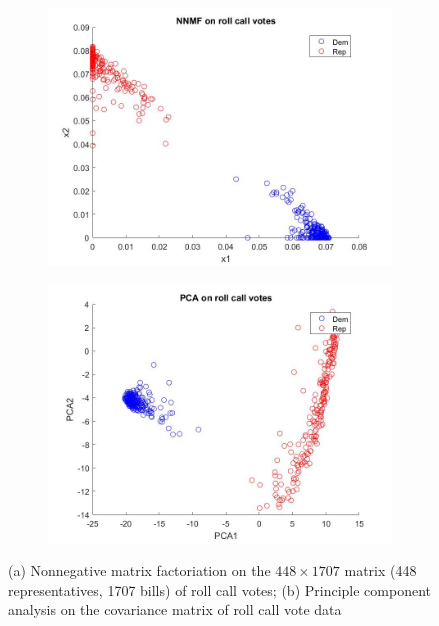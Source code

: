 \documentclass{article}
\begin{document}
\begin{figure}[h]
  \centering
    \begin{subfigure}[b]{0.4\textwidth}
        \includegraphics[width=\textwidth]{NNMF_votes.jpg}
        \caption{}
        \label{fig:NNMF}
    \end{subfigure}
          \begin{subfigure}[b]{0.4\textwidth}
        \includegraphics[width=\textwidth]{PCA_votes}
        \caption{}
        \label{fig:PCA}
    \end{subfigure}
  \caption{(a) Nonnegative matrix factoriation on the $448\times 1707$ matrix (448 representatives, 1707 bills) of roll call votes; (b) Principle component analysis on the covariance matrix of roll call vote data}
\end{figure}
\end{document}
